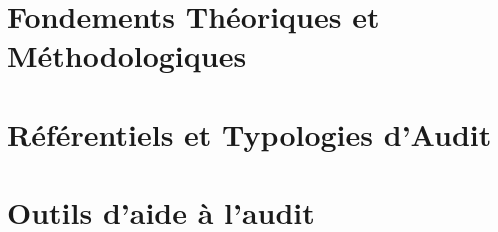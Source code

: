 \documentclass[12pt, a4paper, twoside, openright]{book}
\begin{document}
\lstlistoflistings
{}

\mainmatter



\part{Fondements Théoriques et Méthodologiques}







\part{Référentiels et Typologies d'Audit}





\part{Outils d'aide à l'audit}

\end{document}
